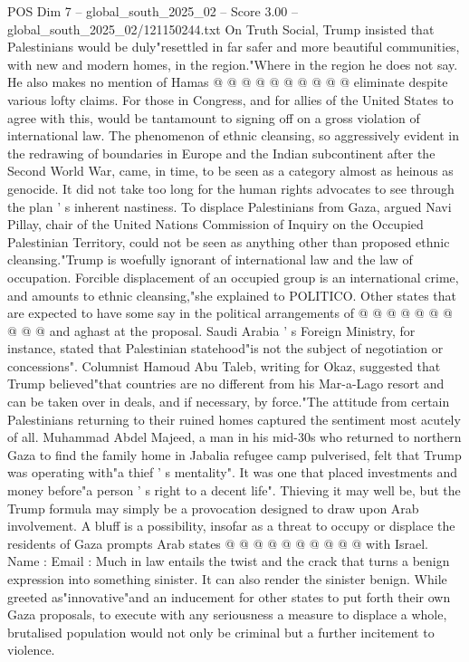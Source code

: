 \begin{textsample}{POS Dim 7 – global\_south\_2025\_02 – Score 3.00 – global\_south\_2025\_02/121150244.txt}
On Truth Social, Trump insisted that Palestinians would be duly"resettled in far safer and more beautiful communities, with new and modern homes, in the region."Where in the region he does not say.
He also makes no mention of Hamas @ @ @ @ @ @ @ @ @ @ eliminate despite various lofty claims.
For those in Congress, and for allies of the United States to agree with this, would be tantamount to signing off on a gross violation of international law.
The phenomenon of ethnic cleansing, so aggressively evident in the redrawing of boundaries in Europe and the Indian subcontinent after the Second World War, came, in time, to be seen as a category almost as heinous as genocide.
It did not take too long for the human rights advocates to see through the plan ' s inherent nastiness.
To displace Palestinians from Gaza, argued Navi Pillay, chair of the United Nations Commission of Inquiry on the Occupied Palestinian Territory, could not be seen as anything other than proposed ethnic cleansing."Trump is woefully ignorant of international law and the law of occupation.
Forcible displacement of an occupied group is an international crime, and amounts to ethnic cleansing,"she explained to POLITICO.
Other states that are expected to have some say in the political arrangements of @ @ @ @ @ @ @ @ @ @ and aghast at the proposal.
Saudi Arabia ' s Foreign Ministry, for instance, stated that Palestinian statehood"is not the subject of negotiation or concessions".
Columnist Hamoud Abu Taleb, writing for Okaz, suggested that Trump believed"that countries are no different from his Mar-a-Lago resort and can be taken over in deals, and if necessary, by force."The attitude from certain Palestinians returning to their ruined homes captured the sentiment most acutely of all.
Muhammad Abdel Majeed, a man in his mid-30s who returned to northern Gaza to find the family home in Jabalia refugee camp pulverised, felt that Trump was operating with"a thief ' s mentality".
It was one that placed investments and money before"a person ' s right to a decent life".
Thieving it may well be, but the Trump formula may simply be a provocation designed to draw upon Arab involvement.
A bluff is a possibility, insofar as a threat to occupy or displace the residents of Gaza prompts Arab states @ @ @ @ @ @ @ @ @ @ with Israel.
Name : Email : Much in law entails the twist and the crack that turns a benign expression into something sinister.
It can also render the sinister benign.
While greeted as"innovative"and an inducement for other states to put forth their own Gaza proposals, to execute with any seriousness a measure to displace a whole, brutalised population would not only be criminal but a further incitement to violence.

\end{textsample}

